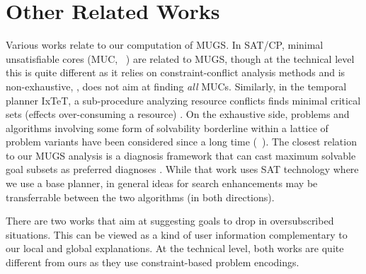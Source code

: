 \section{Other Related Works}
\label{related}



Various works relate to our computation of MUGS. In SAT/CP, minimal
unsatisfiable cores (MUC, \eg\ \cite{chinneck:2007,laborie:ecai-14})
are related to MUGS, though at the technical level this is quite
different as it relies on constraint-conflict analysis methods and is
non-exhaustive, \ie, does not aim at finding \emph{all}
MUCs. Similarly, in the temporal planner IxTeT, a sub-procedure
analyzing resource conflicts finds minimal critical sets (effects
over-consuming a resource) \cite{laborie:ghallab:ijcai-95}. On the
exhaustive side, problems and algorithms involving some form of
solvability borderline within a lattice of problem variants have been
considered since a long time
(\eg\ \cite{dekleer:ai-86:atms,reiter:ai-87}). The closest relation to
our MUGS analysis is a diagnosis framework that can cast maximum
solvable goal subsets as preferred diagnoses
\cite{grastien:etal:kr-12}. While that work uses SAT technology where
we use a base planner, in general ideas for search enhancements may be
transferrable between the two algorithms (in both directions).

There are two works \cite{yu:etal:jair-17,lauffer:topcu:xaip-19} that
aim at suggesting goals to drop in oversubscribed situations. This can
be viewed as a kind of user information complementary to our local and
global explanations. At the technical level, both works are quite
different from ours as they use constraint-based problem encodings.

